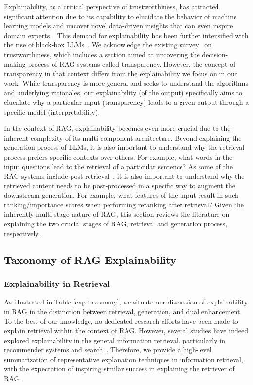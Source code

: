 Explainability, as a critical perspective of trustworthiness, has attracted significant attention due to its capability to elucidate the behavior of machine learning models and uncover novel data-driven insights that can even inspire domain experts~\cite{selvaraju2020grad, robnik2018perturbation, ribeiro2016should, liu2023fair, feng2023degree, ying2019gnnexplainer}. This demand for explainability has been further intensified with the rise of black-box LLMs~\cite{liang2022holistic, sudhi2024rag}. We acknowledge the existing survey~\cite{zhou2024trustworthiness} on trustworthiness, which includes a section aimed at uncovering the decision-making process of RAG systems called transparency. However, the concept of transparency in that context differs from the explainability we focus on in our work. While transparency is more general and seeks to understand the algorithms and underlying rationales, our explainability (of the output) specifically aims to elucidate why a particular input (transparency) leads to a given output through a specific model (interpretability).

In the context of RAG, explainability becomes even more crucial due to the inherent complexity of its multi-component architecture. Beyond explaining the generation process of LLMs, it is also important to understand why the retrieval process prefers specific contexts over others. For example, what words in the input questions lead to the retrieval of a particular sentence? As some of the RAG systems include post-retrieval~\cite{glass2022re2g,kim2024sure,yang2023prca}, it is also important to understand why the retrieved content needs to be post-processed in a specific way to augment the downstream generation. For example, what features of the input result in such ranking/importance scores when performing reranking after retrieval? Given the inherently multi-stage nature of RAG, this section reviews the literature on explaining the two crucial stages of RAG, retrieval and generation process, respectively.



\subsection{Taxonomy of RAG Explainability}


\subsubsection{Explainability in Retrieval}
As illustrated in Table \ref{exp-taxonomy}, we situate our discussion of explainability in RAG in the distinction between retrieval, generation, and dual enhancement. To the best of our knowledge, no dedicated research efforts have been made to explain retrieval within the context of RAG. However, several studies have indeed explored explainability in the general information retrieval, particularly in recommender systems and search~\cite{zhang2020explainable,zhang201919,zhang2018sigir}. Therefore, we provide a high-level summarization of representative explanation techniques in information retrieval, with the expectation of inspiring similar success in explaining the retriever of RAG.

